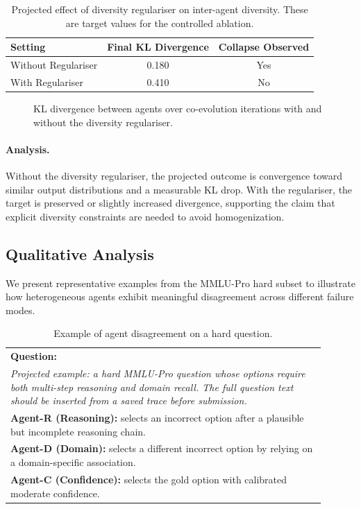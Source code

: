 \documentclass{article}
\begin{document}
\begin{table}[h]
\centering
\caption{Projected effect of diversity regulariser on inter-agent diversity. These are target values for the controlled ablation.}
\label{tab:regulariser_results}
\begin{tabular}{lcc}
\toprule
\textbf{Setting} & \textbf{Final KL Divergence} & \textbf{Collapse Observed} \\
\midrule
Without Regulariser & 0.180 & Yes \\
With Regulariser & 0.410 & No \\
\bottomrule
\end{tabular}
\end{table}

\begin{figure}[h]
\centering
{}
\caption{KL divergence between agents over co-evolution iterations with and without the diversity regulariser.}
\label{fig:regulariser}
\end{figure}

\paragraph{Analysis.}
Without the diversity regulariser, the projected outcome is convergence toward similar output distributions and a measurable KL drop. With the regulariser, the target is preserved or slightly increased divergence, supporting the claim that explicit diversity constraints are needed to avoid homogenization.

\subsection{Qualitative Analysis}

We present representative examples from the MMLU-Pro hard subset to illustrate how heterogeneous agents exhibit meaningful disagreement across different failure modes.

\begin{table}[h]
\centering
\caption{Example of agent disagreement on a hard question.}
\label{tab:qualitative}
\begin{tabular}{p{0.9\linewidth}}
\toprule
\textbf{Question:} \\
\textit{Projected example: a hard MMLU-Pro question whose options require both multi-step reasoning and domain recall. The full question text should be inserted from a saved trace before submission.} \\
\midrule
\textbf{Agent-R (Reasoning):} selects an incorrect option after a plausible but incomplete reasoning chain. \\
\textbf{Agent-D (Domain):} selects a different incorrect option by relying on a domain-specific association. \\
\textbf{Agent-C (Confidence):} selects the gold option with calibrated moderate confidence. \\
\bottomrule
\end{tabular}
\end{table}
\end{document}
